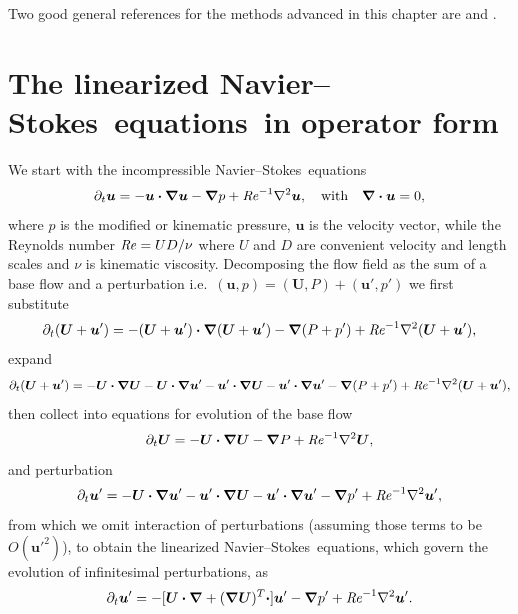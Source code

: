\documentclass[11pt,a4paper]{report}
\newcommand\Rey{\mbox{\textit{Re}}}
\newcommand\NavSto{Navier--Stokes}
\newcommand\LNS{linearized \NavSto}
\newcommand\LNSE{\LNS\ equations}
\newcommand{\ie}{i.e.\ }
\newcommand\Ubase{{\bm{U}}}
\newcommand\Pbase{P}
\newcommand\upert{{\bm{u}'}}
\newcommand\ppert{{p}'}
\newcommand\uvec{\bm{u}}
\begin{document}
Two good general references for the methods advanced in this chapter
are \citet{tuba00} and \citet{bbs08b}.

\section{The \LNSE\ in operator form}

We start with the incompressible \NavSto\ equations
\begin{equation}
\partial_t\uvec=-\uvec\bm{\cdot \nabla}\uvec -\bm{\nabla} p
+\Rey^{-1}\nabla^2 \uvec, \quad \text{with} \quad\bm{\nabla\cdot}\uvec=0,
\end{equation}
where $p$ is the modified or kinematic pressure, $\uvec$ is the
velocity vector, while the Reynolds number $\Rey=UD/\nu$ where $U$ and
$D$ are convenient velocity and length scales and $\nu$ is kinematic
viscosity. 
%
Decomposing the flow field as the sum of a base flow and a
perturbation \ie $(\uvec,p)=(\Ubase,P)+(\upert,\ppert)$ we first substitute
\begin{equation}
\partial_t(\Ubase+\upert) = -(\Ubase+\upert)\bm{\cdot\nabla}(\Ubase+\upert)
  - \bm{\nabla}(\Pbase+\ppert)
  + \Rey^{-1}\nabla^2(\Ubase+\upert),
\end{equation}
expand
\begin{equation}
\partial_t(\Ubase+\upert) =
-\Ubase\bm{\cdot\nabla}\Ubase
-\Ubase\bm{\cdot\nabla}\upert
-\upert\bm{\cdot\nabla}\Ubase
-\upert\bm{\cdot\nabla}\upert
- \bm{\nabla}(\Pbase+\ppert)  
+ \Rey^{-1}\nabla^2(\Ubase+\upert), 
\end{equation}
then collect into equations for evolution of the base flow
\begin{equation}
\partial_t\Ubase =
-\Ubase\bm{\cdot\nabla}\Ubase
- \bm{\nabla}\Pbase
+ \Rey^{-1}\nabla^2\Ubase,
\end{equation}
and perturbation
\begin{equation}
\partial_t\upert =
-\Ubase\bm{\cdot\nabla}\upert
-\upert\bm{\cdot\nabla}\Ubase
-\upert\bm{\cdot\nabla}\upert
- \bm{\nabla}\ppert
+ \Rey^{-1}\nabla^2\upert,
\end{equation}
from which we omit interaction of perturbations (assuming those terms
to be $O(\upert^2)$), to obtain the \LNSE, which
govern the evolution of infinitesimal perturbations, as
\begin{equation}
\partial_t\upert
=-[\bm{U \cdot\nabla}+(\bm{\nabla U})^T\bm{\cdot}] \upert 
-\bm{\nabla} \ppert+\Rey^{-1}\nabla^2 \upert.
\label{eqn.LNS} 				
\end{equation}
\end{document}
